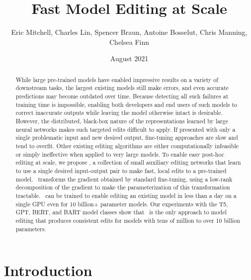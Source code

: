 \documentclass{article}
\title{Fast Model Editing at Scale}
\author{Eric Mitchell, Charles Lin, Spencer Braun, Antoine Bosselut, Chris Manning, Chelsea Finn}
\date{August 2021}
\begin{document}
\maketitle

\begin{abstract}
    While large pre-trained models have enabled impressive results on a variety of downstream tasks, the largest existing models still make errors, and even accurate predictions may become outdated over time. Because detecting all such failures at training time is impossible, enabling both developers and end users of such models to correct inaccurate outputs while leaving the model otherwise intact is desirable. However, the distributed, black-box nature of the representations learned by large neural networks makes such targeted edits difficult to apply. If presented with only a single problematic input and new desired output, fine-tuning approaches are slow and tend to overfit. Other existing editing algorithms are either computationally infeasible or simply ineffective when applied to very large models. To enable easy post-hoc editing at scale, we propose \name, a collection of small auxiliary editing networks that learn to use a single desired input-output pair to make fast, local edits to a pre-trained model. \name~transforms the gradient obtained by standard fine-tuning, using a low-rank decomposition of the gradient to make the parameterization of this transformation tractable. \name~can be trained to enable editing an existing model in less than a day on a single GPU even for 10 billion+ parameter models. Our experiments with the T5, GPT, BERT, and BART model classes show that \name~is the only approach to model editing that produces consistent edits for models with tens of million to over 10 billion parameters.
\end{abstract}

\section{Introduction}
\label{sec:intro}


\end{document}
